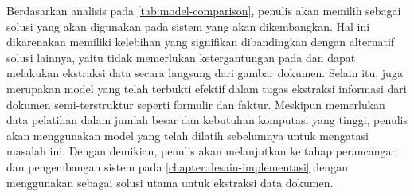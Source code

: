 \pagebreak

Berdasarkan analisis pada \autoref{tab:model-comparison}, penulis akan memilih \donut{} sebagai solusi yang akan digunakan pada sistem yang akan dikembangkan. Hal ini dikarenakan \donut{} memiliki kelebihan yang signifikan dibandingkan dengan alternatif solusi lainnya, yaitu tidak memerlukan ketergantungan pada \ocr{} dan dapat melakukan ekstraksi data secara langsung dari gambar dokumen. Selain itu, \donut{} juga merupakan model yang telah terbukti efektif dalam tugas ekstraksi informasi dari dokumen semi-terstruktur seperti formulir dan faktur. Meskipun \donut{} memerlukan data pelatihan dalam jumlah besar dan kebutuhan komputasi yang tinggi, penulis akan menggunakan model \donut{} yang telah dilatih sebelumnya untuk mengatasi masalah ini. Dengan demikian, penulis akan melanjutkan ke tahap perancangan dan pengembangan sistem pada \autoref{chapter:desain-implementasi} dengan menggunakan \donut{} sebagai solusi utama untuk ekstraksi data dokumen.